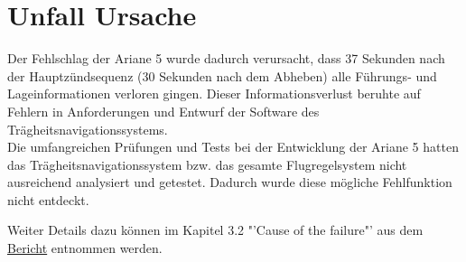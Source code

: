 \section{Unfall Ursache}
Der Fehlschlag der Ariane 5 wurde dadurch verursacht, dass 37 Sekunden nach der Hauptzündsequenz (30 Sekunden nach dem Abheben) alle Führungs- und Lageinformationen verloren gingen. Dieser Informationsverlust beruhte auf Fehlern in Anforderungen und Entwurf der Software des Trägheitsnavigationssystems.\\
Die umfangreichen Prüfungen und Tests bei der Entwicklung der Ariane 5 hatten das Trägheitsnavigationssystem bzw. das gesamte Flugregelsystem nicht ausreichend analysiert und getestet. Dadurch wurde diese mögliche Fehlfunktion nicht entdeckt.

Weiter Details dazu können im Kapitel 3.2 "'Cause of the failure"' aus dem \href{http://sunnyday.mit.edu/nasa-class/Ariane5-report.html}{Bericht} entnommen werden.